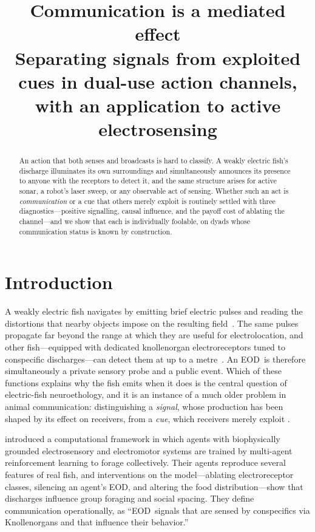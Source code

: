 \documentclass[10pt,twoside]{article}
\title{\bfseries Communication is a mediated effect\\
\large Separating signals from exploited cues in dual-use action channels,
with an application to active electrosensing}
\author{}
\date{}
\newcommand{\eod}{EOD}
\begin{document}
\maketitle

\begin{abstract}
\noindent
An action that both senses and broadcasts is hard to classify. A weakly electric
fish's discharge illuminates its own surroundings and simultaneously announces its
presence to anyone with the receptors to detect it, and the same structure arises
for active sonar, a robot's laser sweep, or any observable act of sensing. Whether
such an act is \emph{communication} or a cue that others merely exploit is
routinely settled with three diagnostics---positive signalling, causal influence,
and the payoff cost of ablating the channel---and we show that each is
individually foolable, on dyads whose communication status is known by
construction.
%
\ABSTRACTRESULTS
\end{abstract}

\section{Introduction}

A weakly electric fish navigates by emitting brief electric pulses and reading
the distortions that nearby objects impose on the resulting
field~\citep{lissmann1963electric,vonderemde1999active}. The same pulses
propagate far beyond the range at which they are useful for
electrolocation, and other fish---equipped with dedicated knollenorgan
electroreceptors tuned to conspecific discharges---can detect them at up to a
metre~\citep{hopkins1988neuroethology}. An \eod\ is therefore simultaneously a
private sensory probe and a public event. Which of these functions explains why
the fish emits when it does is the central question of electric-fish
neuroethology, and it is an instance of a much older problem in animal
communication: distinguishing a \emph{signal}, whose production has been shaped
by its effect on receivers, from a \emph{cue}, which receivers merely exploit
\citep{maynardsmith2003animal,scottphillips2008defining}.

\citet{singh2025active} introduced a computational framework in which agents with
biophysically grounded electrosensory and electromotor systems are trained by
multi-agent reinforcement learning to forage collectively. Their agents reproduce
several features of real fish, and interventions on the model---ablating
electroreceptor classes, silencing an agent's \eod, and altering the food
distribution---show that discharges influence group foraging and social spacing.
They define communication operationally, as ``\eod\ signals that are sensed by
conspecifics via Knollenorgans and that influence their behavior.''
\end{document}
